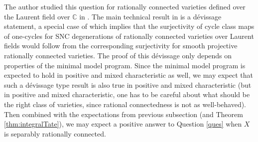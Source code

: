 \documentclass{amsart}
\theoremstyle{definition}
\theoremstyle{remark}
\newcommand{\mbb}{\mathbb}
\newcommand{\CC}{\mbb{C}}
\begin{document}
The author studied this question for rationally connected varieties defined over the Laurent field over $\CC$ in \cite{zerocycleLaurent}. The main technical result in \cite{zerocycleLaurent} is a d\'evissage statement, a special case of which implies that the surjectivity of cycle class maps of one-cycles for SNC degenerations of rationally connected varieties over Laurent fields would follow from the corresponding surjectivity for smooth projective rationally connected varieties. The proof of this d\'evissage only depends on properties of the minimal model program. Since the minimal model program is expected to hold in positive and mixed characteristic as well, we may expect that such a d\'evissage type result is also true in positive and mixed characteristic (but in positive and mixed characteristic, one has to be careful about what should be the right class of varieties, since rational connectedness is not as well-behaved). Then combined with the expectations from previous subsection (and Theorem \ref{thm:integralTate}),  we may expect a positive answer to Question \ref{ques} when $X$ is separably rationally connected.








\end{document}
